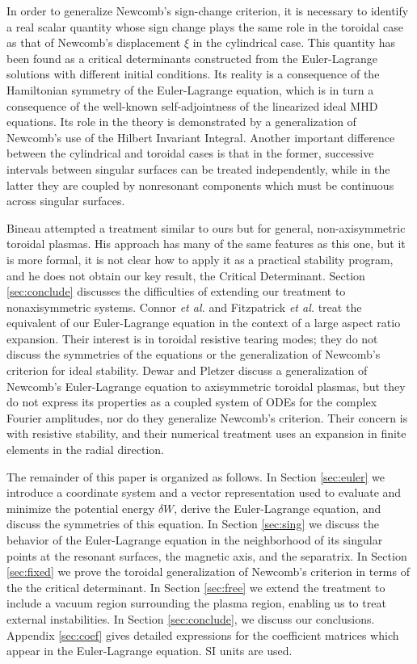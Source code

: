 \documentclass[prb,twocolumn,showpacs,preprintnumbers,amsmath,amssymb]{revtex4}
\begin{document}
In order to generalize Newcomb's sign-change criterion, it is necessary
to identify a real scalar quantity whose sign change plays the same role
in the toroidal case as that of Newcomb's displacement $\xi$ in the
cylindrical case.  This quantity has been found as a critical
determinants constructed from the Euler-Lagrange solutions with
different initial conditions.  Its reality is a consequence of the
Hamiltonian symmetry of the Euler-Lagrange equation, which is in turn a
consequence of the well-known self-adjointness of the linearized ideal
MHD equations.  Its role in the theory is demonstrated by a
generalization of Newcomb's use of the Hilbert Invariant Integral.
Another important difference between the cylindrical and toroidal cases
is that in the former, successive intervals between singular surfaces
can be treated independently, while in the latter they are coupled by
nonresonant components which must be continuous across singular
surfaces.

Bineau\cite{mb61} attempted a treatment similar to ours but for general,
non-axisymmetric toroidal plasmas.  His approach has many of the same
features as this one, but it is more formal, it is not clear how to
apply it as a practical stability program, and he does not obtain our
key result, the Critical Determinant.  Section \ref{sec:conclude}
discusses the difficulties of extending our treatment to nonaxisymmetric
systems.  Connor {\it et al.}\cite{jwc88} and Fitzpatrick \textit{et
al.}\cite{rf93} treat the equivalent of our Euler-Lagrange equation in
the context of a large aspect ratio expansion.  Their interest is in
toroidal resistive tearing modes; they do not discuss the symmetries of
the equations or the generalization of Newcomb's criterion for ideal
stability.  Dewar and Pletzer\cite{rld90, ap94} discuss a generalization
of Newcomb's Euler-Lagrange equation to axisymmetric toroidal plasmas,
but they do not express its properties as a coupled system of ODEs for
the complex Fourier amplitudes, nor do they generalize Newcomb's
criterion.  Their concern is with resistive stability, and their
numerical treatment uses an expansion in finite elements in the radial
direction.

The remainder of this paper is organized as follows.  In Section
\ref{sec:euler} we introduce a coordinate system and a vector
representation used to evaluate and minimize the potential energy
$\delta W$, derive the Euler-Lagrange equation, and discuss the
symmetries of this equation.  In Section \ref{sec:sing} we discuss the
behavior of the Euler-Lagrange equation in the neighborhood of its
singular points at the resonant surfaces, the magnetic axis, and the
separatrix.  In Section \ref{sec:fixed} we prove the toroidal
generalization of Newcomb's criterion in terms of the the critical
determinant.  In Section \ref{sec:free} we extend the treatment to
include a vacuum region surrounding the plasma region, enabling us to
treat external instabilities.  In Section \ref{sec:conclude}, we discuss
our conclusions.  Appendix \ref{sec:coef} gives detailed expressions for
the coefficient matrices which appear in the Euler-Lagrange equation.
SI units are used.
\end{document}
